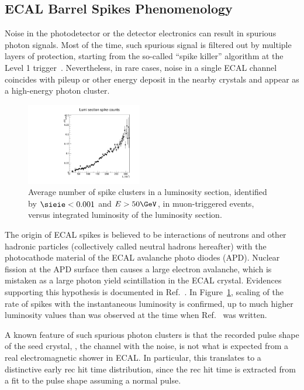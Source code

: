 \subsection{ECAL Barrel Spikes Phenomenology}
\label{sec:spikes}

Noise in the photodetector or the detector electronics can result in spurious photon signals. 
Most of the time, such spurious signal is filtered out by multiple layers of protection, starting from the so-called ``spike killer'' algorithm at the Level 1 trigger~\cite{CMS_AN_2010-357}. 
Nevertheless, in rare cases, noise in a single ECAL channel coincides with pileup or other energy deposit in the nearby crystals and appear as a high-energy photon cluster.

\begin{figure}[tbp]
  \begin{center}
    \includegraphics[width=0.45\textwidth]{Reconstruction/Figures/spikes/spike_lumi_scaling.pdf}
    \caption{
      Average number of spike clusters in a luminosity section, identified by $\sieie < 0.001$ and $E > 50\GeV$, in muon-triggered events, versus integrated luminosity of the luminosity section.
    }
    \label{fig:spike_lumi_scaling}
  \end{center}
\end{figure}

The origin of ECAL spikes is believed to be interactions of neutrons and other hadronic particles (collectively called neutral hadrons hereafter) with the photocathode material of the ECAL avalanche photo diodes (APD). 
Nuclear fission at the APD surface then causes a large electron avalanche, which is mistaken as a large photon yield scintillation in the ECAL crystal. 
Evidences supporting this hypothesis is documented in Ref.~\cite{CMS_AN_2010-357}. 
In Figure~\ref{fig:spike_lumi_scaling}, scaling of the rate of spikes with the instantaneous luminosity is confirmed, up to much higher luminosity values than was observed at the time when Ref.~\cite{CMS_AN_2010-357} was written.

A known feature of such spurious photon clusters is that the recorded pulse shape of the seed crystal, \ie, the channel with the noise, is not what is expected from a real electromagnetic shower in ECAL. 
In particular, this translates to a distinctive early rec hit time distribution, since the rec hit time is extracted from a fit to the pulse shape assuming a normal pulse.

